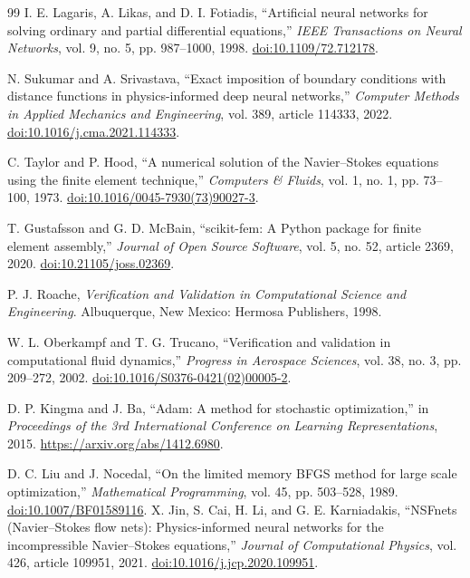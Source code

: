 \begin{thebibliography}{99}
I. E. Lagaris, A. Likas, and D. I. Fotiadis, ``Artificial neural networks
for solving ordinary and partial differential equations,'' \emph{IEEE
Transactions on Neural Networks}, vol. 9, no. 5, pp. 987--1000, 1998.
\href{https://doi.org/10.1109/72.712178}{doi:10.1109/72.712178}.

N. Sukumar and A. Srivastava, ``Exact imposition of boundary conditions
with distance functions in physics-informed deep neural networks,''
\emph{Computer Methods in Applied Mechanics and Engineering}, vol. 389,
article 114333, 2022.
\href{https://doi.org/10.1016/j.cma.2021.114333}{doi:10.1016/j.cma.2021.114333}.

C. Taylor and P. Hood, ``A numerical solution of the Navier--Stokes equations
using the finite element technique,'' \emph{Computers \& Fluids}, vol. 1,
no. 1, pp. 73--100, 1973.
\href{https://doi.org/10.1016/0045-7930(73)90027-3}{doi:10.1016/0045-7930(73)90027-3}.

T. Gustafsson and G. D. McBain, ``scikit-fem: A Python package for finite
element assembly,'' \emph{Journal of Open Source Software}, vol. 5,
no. 52, article 2369, 2020.
\href{https://doi.org/10.21105/joss.02369}{doi:10.21105/joss.02369}.

P. J. Roache, \emph{Verification and Validation in Computational Science
and Engineering}. Albuquerque, New Mexico: Hermosa Publishers, 1998.

W. L. Oberkampf and T. G. Trucano, ``Verification and validation in
computational fluid dynamics,'' \emph{Progress in Aerospace Sciences},
vol. 38, no. 3, pp. 209--272, 2002.
\href{https://doi.org/10.1016/S0376-0421(02)00005-2}{doi:10.1016/S0376-0421(02)00005-2}.

D. P. Kingma and J. Ba, ``Adam: A method for stochastic optimization,''
in \emph{Proceedings of the 3rd International Conference on Learning
Representations}, 2015.
\url{https://arxiv.org/abs/1412.6980}.

D. C. Liu and J. Nocedal, ``On the limited memory BFGS method for large
scale optimization,'' \emph{Mathematical Programming}, vol. 45,
pp. 503--528, 1989.
\href{https://doi.org/10.1007/BF01589116}{doi:10.1007/BF01589116}.
X. Jin, S. Cai, H. Li, and G. E. Karniadakis, ``NSFnets (Navier--Stokes
flow nets): Physics-informed neural networks for the incompressible
Navier--Stokes equations,'' \emph{Journal of Computational Physics},
vol. 426, article 109951, 2021.
\href{https://doi.org/10.1016/j.jcp.2020.109951}{doi:10.1016/j.jcp.2020.109951}.


\end{thebibliography}
